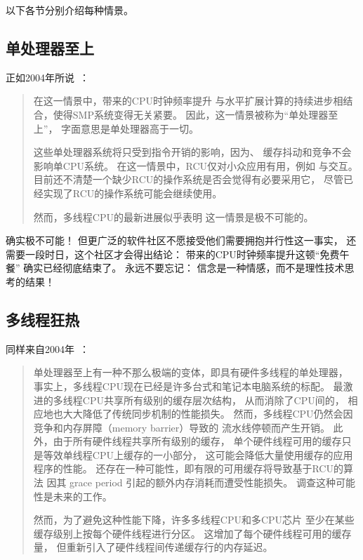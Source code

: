 以下各节分别介绍每种情景。

\subsection{单处理器至上}
\label{sec:future:Uniprocessor \"Uber Alles}

正如2004年所说~\cite{PaulEdwardMcKenneyPhD}：

\begin{quote}
	在这一情景中，带来的CPU时钟频率提升
	与水平扩展计算的持续进步相结合，使得SMP系统变得无关紧要。
	因此，这一情景被称为``单处理器至上''，
	字面意思是单处理器高于一切。

	这些单处理器系统将只受到指令开销的影响，因为、
	缓存抖动和竞争不会影响单CPU系统。
	在这一情景中，RCU仅对小众应用有用，例如
	与交互。
	目前还不清楚一个缺少RCU的操作系统是否会觉得有必要采用它，
	尽管已经实现了RCU的操作系统可能会继续使用。

	然而，多线程CPU的最新进展似乎表明
	这一情景是极不可能的。
\end{quote}

确实极不可能！
但更广泛的软件社区不愿接受他们需要拥抱并行性这一事实，
还需要一段时日，这个社区才会得出结论：
带来的CPU时钟频率提升这顿``免费午餐''
确实已经彻底结束了。
永远不要忘记：
信念是一种情感，而不是理性技术思考的结果！

\subsection{多线程狂热}
\label{sec:future:Multithreaded Mania}

同样来自2004年~\cite{PaulEdwardMcKenneyPhD}：

\begin{quote}
	单处理器至上有一种不那么极端的变体，即具有硬件多线程的单处理器，
	事实上，多线程CPU现在已经是许多台式和笔记本电脑系统的标配。
	最激进的多线程CPU共享所有级别的缓存层次结构，
	从而消除了CPU间的，
	相应地也大大降低了传统同步机制的性能损失。
	然而，多线程CPU仍然会因竞争和内存屏障（memory barrier）导致的
	流水线停顿而产生开销。
	此外，由于所有硬件线程共享所有级别的缓存，
	单个硬件线程可用的缓存只是等效单线程CPU上缓存的一小部分，
	这可能会降低大量使用缓存的应用程序的性能。
	还存在一种可能性，即有限的可用缓存将导致基于RCU的算法
	因其 grace period 引起的额外内存消耗而遭受性能损失。
	调查这种可能性是未来的工作。

	然而，为了避免这种性能下降，许多多线程CPU和多CPU芯片
	至少在某些缓存级别上按每个硬件线程进行分区。
	这增加了每个硬件线程可用的缓存量，
	但重新引入了硬件线程间传递缓存行的内存延迟。
\end{quote}


